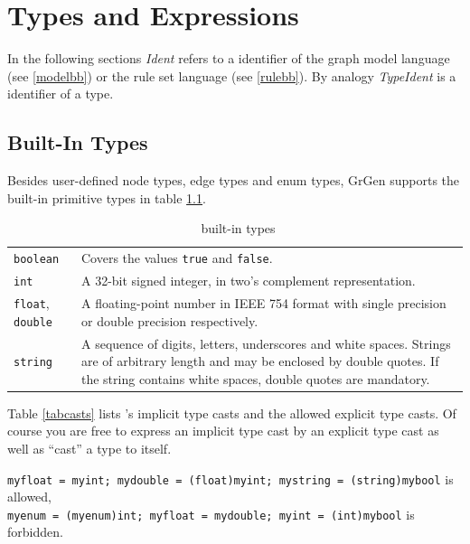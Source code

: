 \chapter{Types and Expressions}
\label{typeexpr}

In the following sections \emph{Ident} refers to a identifier of the graph model language (see \ref{modelbb}) or the rule set language (see \ref{rulebb}). By analogy \emph{TypeIdent} is a identifier of a type.

\section{Built-In Types}
\label{builtin}
Besides user-defined node types, edge types and enum types, GrGen supports the built-in primitive types in table \ref{builtintypes}.
\begin{table}[htbp]
\begin{tabularx}{\linewidth}{|l|X|}\hline
	\texttt{boolean} & Covers the values \texttt{true} and \texttt{false}. \\
	\texttt{int} & A 32-bit signed integer, in two's complement representation. \\
	\texttt{float}, \texttt{double} & A floating-point number in IEEE 754 format with single precision or double precision respectively. \\
	\texttt{string} & A sequence of digits, letters, underscores and white spaces. Strings are of arbitrary length and may be enclosed by double quotes. If the string contains white spaces, double quotes are mandatory.\\ \hline
\end{tabularx}
\caption{\GrG\ built-in types}
\label{builtintypes}
\end{table}
Table \ref{tabcasts} lists \GrG's implicit type casts and the allowed explicit type casts. Of course you are free to express an implicit type cast by an explicit type cast as well as ``cast'' a type to itself.
\begin{example}
  \texttt{myfloat = myint; mydouble = (float)myint; mystring = (string)mybool} is allowed, \\
  \texttt{myenum = (myenum)int; myfloat = mydouble; myint = (int)mybool} is forbidden.
\end{example}
